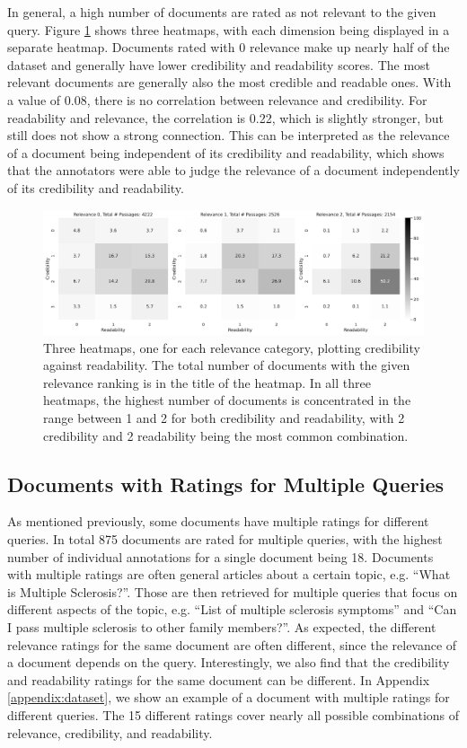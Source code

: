 In general, a high number of documents are rated as not relevant to the given query.
Figure \ref{fig:heatmap_rel_cred_read} shows three heatmaps, with each dimension being displayed in a separate heatmap.
Documents rated with 0 relevance make up nearly half of the dataset and generally have lower credibility and readability scores.
The most relevant documents are generally also the most credible and readable ones.
With a value of 0.08, there is no correlation between relevance and credibility.
For readability and relevance, the correlation is 0.22, which is slightly stronger, but still does not show a strong connection.
This can be interpreted as the relevance of a document being independent of its credibility and readability, which shows that the annotators were able to judge the relevance of a document independently of its credibility and readability.
\begin{figure}
\centering
\includegraphics[width=\textwidth]{images/heatmap_qrels.pdf}
\caption{Three heatmaps, one for each relevance category, plotting credibility against readability.
The total number of documents with the given relevance ranking is in the title of the heatmap.
In all three heatmaps, the highest number of documents is concentrated in the range between 1 and 2 for both credibility and readability, with 2 credibility and 2 readability being the most common combination.
}
\label{fig:heatmap_rel_cred_read}
\end{figure}

\subsection{Documents with Ratings for Multiple Queries}\label{sec:documents-with-multiple-ratings}
As mentioned previously, some documents have multiple ratings for different queries.
In total 875 documents are rated for multiple queries, with the highest number of individual annotations for a single document being 18.
Documents with multiple ratings are often general articles about a certain topic, e.g. ``What is Multiple Sclerosis?''.
Those are then retrieved for multiple queries that focus on different aspects of the topic, e.g. ``List of multiple sclerosis symptoms'' and ``Can I pass multiple sclerosis to other family members?''.
As expected, the different relevance ratings for the same document are often different, since the relevance of a document depends on the query.
Interestingly, we also find that the credibility and readability ratings for the same document can be different.
In Appendix \ref{appendix:dataset}, we show an example of a document with multiple ratings for different queries.
The 15 different ratings cover nearly all possible combinations of relevance, credibility, and readability.

